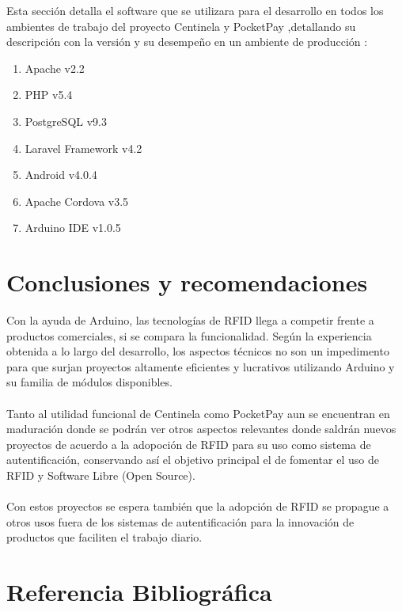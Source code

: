 \documentclass[11pt,twocolumn]{article}
\begin{document}
	Esta secci\'on detalla el software que se utilizara para el desarrollo en 
	todos los ambientes de trabajo del proyecto Centinela y PocketPay ,detallando su 
	descripci\'on con la versi\'on y su desempe\~no en un ambiente de producci\'on :
	
	\begin{enumerate}
		\item Apache v2.2
		\item PHP v5.4
		\item PostgreSQL v9.3
		\item Laravel Framework v4.2
		\item Android v4.0.4
		\item Apache Cordova v3.5
		\item Arduino IDE v1.0.5
	\end{enumerate}

\section{Conclusiones y recomendaciones}

Con la ayuda de Arduino, las tecnolog\'ias de RFID llega a competir  frente a 
productos comerciales, si se compara la funcionalidad. Seg\'un la experiencia 
obtenida a lo largo del desarrollo, los  aspectos t\'ecnicos no son un impedimento 
para que surjan proyectos altamente eficientes y lucrativos  utilizando Arduino 
y su familia de m\'odulos disponibles. \\
\\	
Tanto al utilidad funcional de Centinela como PocketPay aun se encuentran en maduraci\'on donde se podr\'an ver otros aspectos relevantes donde saldr\'an nuevos proyectos de acuerdo a la adopoci\'on de RFID para su uso como sistema de autentificaci\'on, conservando as\'i el objetivo principal el de fomentar el uso de RFID y Software Libre (Open Source).\\
\\
Con estos proyectos se espera tambi\'en que la adopci\'on de RFID se propague a otros usos fuera de los sistemas de autentificaci\'on para la innovaci\'on de productos que faciliten el trabajo diario.


\section{Referencia Bibliogr\'afica}
	
\end{document}
